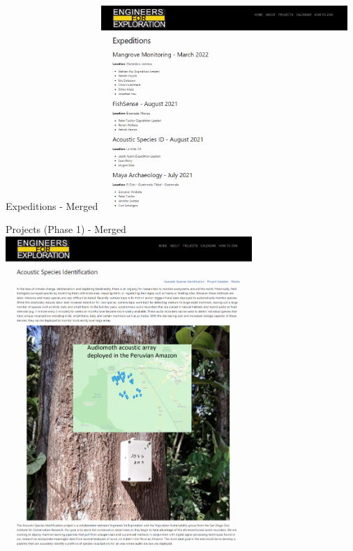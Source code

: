 \begin{frame}{Expeditions - Merged}
    \centering
    \includegraphics[height=0.7\textheight,width=0.7\textwidth,keepaspectratio]{./images/Screenshot 2024-04-29 123255.png}
\end{frame}
\begin{frame}{Projects (Phase 1) - Merged}
    \centering
    \includegraphics[height=0.7\textheight,width=0.7\textwidth,keepaspectratio]{./images/Screenshot 2024-04-29 123500.png}
\end{frame}
